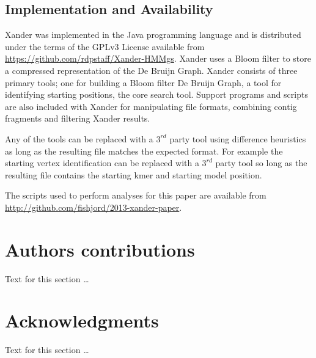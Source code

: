 \documentclass[10pt]{bmc_article}
\newenvironment{bmcformat}{\begin{raggedright}\baselineskip20pt\sloppy\setboolean{publ}{false}}{\end{raggedright}\baselineskip20pt\sloppy}
\begin{document}
\begin{bmcformat}
\subsection*{Implementation and Availability}
Xander was implemented in the Java programming language and is distributed under the terms of the GPLv3 License available from \url{https://github.com/rdpstaff/Xander-HMMgs}.  Xander uses a Bloom filter to store a compressed representation of the De Bruijn Graph. Xander consists of three primary tools; one for building a Bloom filter De Bruijn Graph, a tool for identifying starting positions, the core search tool. Support programs and scripts are also included with Xander for manipulating file formats, combining contig fragments and filtering Xander results.

Any of the tools can be replaced with a $3^{rd}$ party tool using difference heuristics as long as the resulting file matches the expected format.  For example the starting vertex identification can be replaced with a $3^{rd}$ party tool so long as the resulting file contains the starting kmer and starting model position.

The scripts used to perform analyses for this paper are available from \url{http://github.com/fishjord/2013-xander-paper}.
    
\section*{Authors contributions}
    Text for this section \ldots

    

\section*{Acknowledgments}
  Text for this section \ldots


 



\end{bmcformat}
\end{document}

